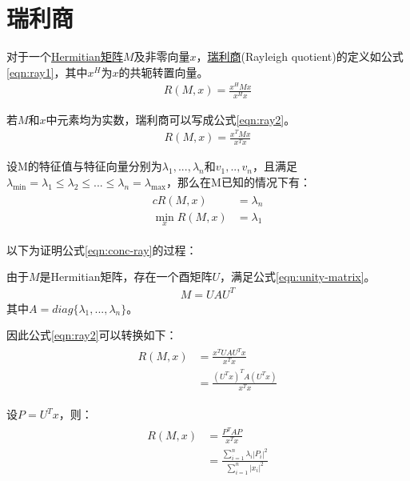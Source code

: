 \section{瑞利商}
\label{sec:rayleigh-quotient}
对于一个\hyperlink{hermitian}{Hermitian矩阵}$M$及非零向量$x$，\href{https://en.wikipedia.org/wiki/Rayleigh_quotient}{瑞利商}(Rayleigh quotient)的定义如公式\ref{eqn:ray1}，其中$x^{H}$为$x$的共轭转置向量。
\begin{align}
\label{eqn:ray1}
R(M,x)=\frac{x^{H}Mx}{x^{H}x}
\end{align}

若$M$和$x$中元素均为实数，瑞利商可以写成公式\ref{eqn:ray2}。
\begin{align}
\label{eqn:ray2}
R(M,x)=\frac{x^{T}Mx}{x^{T}x}
\end{align}

设M的特征值与特征向量分别为$\lambda_1, ..., \lambda_n$和$v_1, .., v_n$，且满足 $\lambda_{\min}=\lambda_1\leq{\lambda_2}\leq{...}\leq{\lambda_n}=\lambda_{\max}$，那么在M已知的情况下有：
\begin{align}
\label{eqn:conc-ray}
\begin{split}
cR(M,x) &= \lambda_{n} \\
\mathop{\min}_{x}R(M,x) &= \lambda_{1}
\end{split}
\end{align}

以下为证明公式\ref{eqn:conc-ray}的过程：

由于$M$是Hermitian矩阵，存在一个酉矩阵$U$，满足公式\ref{eqn:unity-matrix}。
\begin{align}
\label{eqn:unity-matrix}
M=UAU^{T}
\end{align}
其中$A=diag\{\lambda_1, ..., \lambda_n\}$。

因此公式\ref{eqn:ray2}可以转换如下：
\begin{align}
\begin{split}
R(M,x) &= \frac{x^{T}UAU^{T}x}{x^{T}x} \\
       &= \frac{(U^{T}x)^{T}A(U^{T}x)}{x^{T}x}  
\end{split}
\end{align}

设$P=U^{T}x$，则：
\begin{align}
\label{eqn:trans1}
\begin{split}
R(M,x) &= \frac{P^{T}AP}{x^{T}x} \\
       &= \frac{\sum_{i=1}^{n}\lambda_{i}|P_i|^{2}}{\sum_{i=1}^{n}|x_i|^{2}}
\end{split}
\end{align}

